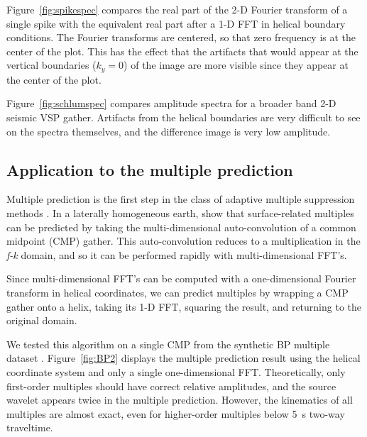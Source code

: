 Figure~\ref{fig:spikespec} compares the real part of the 2-D  Fourier
transform of a single spike with the equivalent real part after a 1-D
FFT in helical boundary conditions.  The Fourier transforms are
centered, so that zero frequency is at the center of the plot.  This
has the effect that the artifacts that would appear at the vertical
boundaries ($k_y=0$) of the image are more visible since they appear
at the center of the plot.

\par
Figure~\ref{fig:schlumspec} compares amplitude spectra for a broader 
band 2-D seismic VSP gather.  Artifacts from the helical boundaries
are very difficult to see on the spectra themselves, and the
difference image is very low amplitude.

\subsection{Application to the multiple prediction}
Multiple prediction is the first step in the class of adaptive
multiple suppression methods \cite[]{GEO57-09-11661177}.
In a laterally homogeneous earth, \cite{kelamis:00} show that 
surface-related multiples can be predicted by taking the
multi-dimensional auto-convolution of a common midpoint (CMP) gather.
This auto-convolution reduces to a multiplication in the {\em f-k}
domain, and so it can be performed rapidly with multi-dimensional
FFT's. 

\par
Since multi-dimensional FFT's can be computed with a one-dimensional
Fourier transform in helical coordinates, we can predict multiples by 
wrapping a CMP gather onto a helix, taking its 1-D FFT, squaring the 
result, and returning to the original domain.

\par
We tested this algorithm on a single CMP from the synthetic BP
multiple dataset \cite[]{BPmultiples}.
Figure~\ref{fig:BP2} displays the multiple prediction result using the
helical coordinate system and only a single one-dimensional FFT. 
Theoretically, only first-order multiples should have correct
relative amplitudes, and the source wavelet appears twice in the
multiple prediction.  However, the kinematics of all 
multiples are almost exact, even for higher-order multiples below 5~s 
two-way traveltime.

